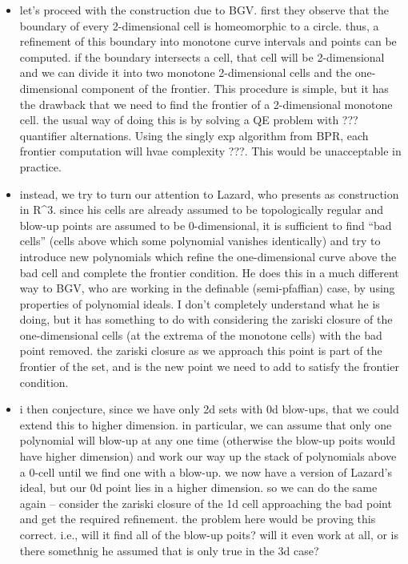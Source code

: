 \documentclass[
]{book}
\providecommand{\tightlist}{%
  \setlength{\itemsep}{0pt}\setlength{\parskip}{0pt}}
\theoremstyle{definition}
\theoremstyle{definition}
\theoremstyle{definition}
\theoremstyle{definition}
\theoremstyle{remark}
\begin{document}
\begin{itemize}
  \begin{itemize}
  \tightlist
  \item
    let's proceed with the construction due to BGV. first they observe that the boundary of every 2-dimensional cell is homeomorphic to a circle. thus, a refinement of this boundary into monotone curve intervals and points can be computed. if the boundary intersects a cell, that cell will be 2-dimensional and we can divide it into two monotone 2-dimensional cells and the one-dimensional component of the frontier. This procedure is simple, but it has the drawback that we need to find the frontier of a 2-dimensional monotone cell. the usual way of doing this is by solving a QE problem with ??? quantifier alternations. Using the singly exp algorithm from BPR, each frontier computation will hvae complexity ???. This would be unacceptable in practice.
  \item
    instead, we try to turn our attention to Lazard, who presents as construction in R\^{}3. since his cells are already assumed to be topologically regular and blow-up points are assumed to be 0-dimensional, it is sufficient to find ``bad cells'' (cells above which some polynomial vanishes identically) and try to introduce new polynomials which refine the one-dimensional curve above the bad cell and complete the frontier condition. He does this in a much different way to BGV, who are working in the definable (semi-pfaffian) case, by using properties of polynomial ideals. I don't completely understand what he is doing, but it has something to do with considering the zariski closure of the one-dimensional cells (at the extrema of the monotone cells) with the bad point removed. the zariski closure as we approach this point is part of the frontier of the set, and is the new point we need to add to satisfy the frontier condition.
  \item
    i then conjecture, since we have only 2d sets with 0d blow-ups, that we could extend this to higher dimension. in particular, we can assume that only one polynomial will blow-up at any one time (otherwise the blow-up poits would have higher dimension) and work our way up the stack of polynomials above a 0-cell until we find one with a blow-up. we now have a version of Lazard's ideal, but our 0d point lies in a higher dimension. so we can do the same again -- consider the zariski closure of the 1d cell approaching the bad point and get the required refinement. the problem here would be proving this correct. i.e., will it find all of the blow-up poits? will it even work at all, or is there somethnig he assumed that is only true in the 3d case?

\end{itemize}
\end{itemize}
\end{document}
